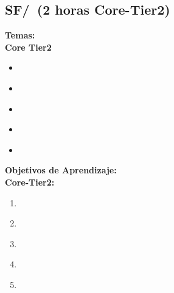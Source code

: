 \subsection{SF/\SFReliabilitythroughRedundancy~(2 horas Core-Tier2)}\label{sec:BOK:SFReliabilitythroughRedundancy}
\noindent \textbf{Temas:}\\
\noindent \textbf{Core Tier2}
\begin{itemize}
	\item \SFReliabilitythroughRedundancyTopicDistinction\label{sec:BOK:SFReliabilitythroughRedundancyTopicDistinction}
	\item \SFReliabilitythroughRedundancyTopicRedundancy\label{sec:BOK:SFReliabilitythroughRedundancyTopicRedundancy}
	\item \SFReliabilitythroughRedundancyTopicRedundancyThrough\label{sec:BOK:SFReliabilitythroughRedundancyTopicRedundancyThrough}
	\item \SFReliabilitythroughRedundancyTopicDuplication\label{sec:BOK:SFReliabilitythroughRedundancyTopicDuplication}
	\item \SFReliabilitythroughRedundancyTopicOther\label{sec:BOK:SFReliabilitythroughRedundancyTopicOther}
\end{itemize}


\noindent \textbf{Objetivos de Aprendizaje:}\\
\noindent \textbf{Core-Tier2:}
\begin{enumerate}
	\setcounter{enumi}{0}
	\item \SFReliabilitythroughRedundancyLOExplainTheProgram\xspace[\SFReliabilitythroughRedundancyLOExplainTheProgramLevel]\label{sec:BOK:SFReliabilitythroughRedundancyLOExplainTheProgram}
	\item \SFReliabilitythroughRedundancyLOArticulateTheDetecting\xspace[\SFReliabilitythroughRedundancyLOArticulateTheDetectingLevel]\label{sec:BOK:SFReliabilitythroughRedundancyLOArticulateTheDetecting}
	\item \SFReliabilitythroughRedundancyLODescribeTheError\xspace[\SFReliabilitythroughRedundancyLODescribeTheErrorLevel]\label{sec:BOK:SFReliabilitythroughRedundancyLODescribeTheError}
	\item \SFReliabilitythroughRedundancyLOApplySimpleExploiting\xspace[\SFReliabilitythroughRedundancyLOApplySimpleExploitingLevel]\label{sec:BOK:SFReliabilitythroughRedundancyLOApplySimpleExploiting}
	\item \SFReliabilitythroughRedundancyLOCompareDifferent\xspace[\SFReliabilitythroughRedundancyLOCompareDifferentLevel]\label{sec:BOK:SFReliabilitythroughRedundancyLOCompareDifferent}
\end{enumerate}



